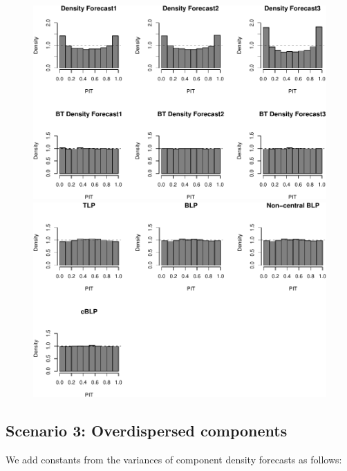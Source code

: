 \documentclass[]{article}
\begin{document}
\clearpage

\begin{figure}[H]

{\centering \includegraphics{Newest_BLPsim_new_files/figure-latex/unnamed-chunk-8-1} \includegraphics{Newest_BLPsim_new_files/figure-latex/unnamed-chunk-8-2} 

}

\end{figure}

\clearpage

\hypertarget{scenario-3-overdispersed-components}{%
\subsection{Scenario 3: Overdispersed
components}\label{scenario-3-overdispersed-components}}

We add constants from the variances of component density forecasts as
follows:
\end{document}
